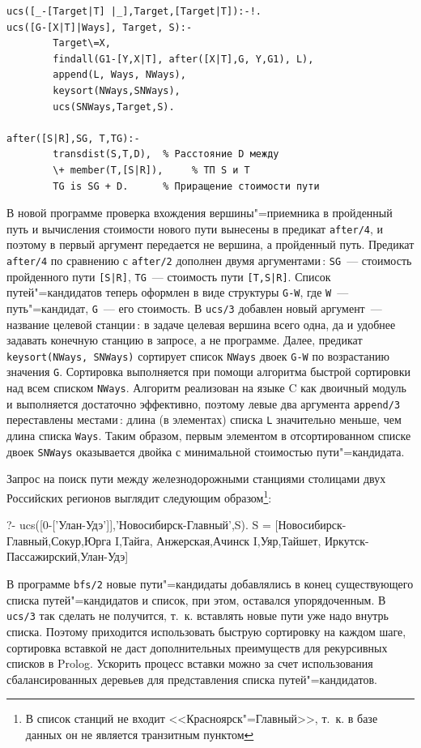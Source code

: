 \documentclass[a4paper,14pt, openany, twoside, draft]{extbook} %
\begin{document}
\begin{verbatim}
ucs([_-[Target|T] |_],Target,[Target|T]):-!.
ucs([G-[X|T]|Ways], Target, S):-
        Target\=X,
        findall(G1-[Y,X|T], after([X|T],G, Y,G1), L),
        append(L, Ways, NWays),
        keysort(NWays,SNWays),
        ucs(SNWays,Target,S).

after([S|R],SG, T,TG):-
        transdist(S,T,D),  % Расстояние D между
        \+ member(T,[S|R]),     % ТП S и T
        TG is SG + D.      % Приращение стоимости пути
\end{verbatim}


В новой программе проверка вхождения вершины"=приемника в пройденный путь и вычисления стоимости нового пути вынесены в предикат \texttt{after/4}, и поэтому в первый аргумент передается не вершина, а пройденный путь.  Предикат \texttt{after/4} по сравнению с \texttt{after/2} дополнен двумя аргументами\,: \texttt{SG}~--- стоимость пройденного пути \texttt{[S|R]}, \texttt{TG}~--- стоимость пути \texttt{[T,S|R]}.  Список путей"=кандидатов теперь оформлен в виде структуры \texttt{G-W}, где \texttt{W}~--- путь"=кандидат, \texttt{G}~--- его стоимость.  В \texttt{ucs/3} добавлен новый аргумент~--- название целевой станции\,: в задаче целевая вершина всего одна, да и удобнее задавать конечную станцию в запросе, а не программе.  Далее, предикат \texttt{keysort(NWays, SNWays)} сортирует список \texttt{NWays} двоек \texttt{G-W} по возрастанию значения \texttt{G}.  Сортировка выполняется при помощи алгоритма быстрой сортировки над всем списком \texttt{NWays}.  Алгоритм реализован на языке C как двоичный модуль и выполняется достаточно эффективно, поэтому левые два аргумента \texttt{append/3} переставлены местами\,: длина (в элементах) списка \texttt{L} значительно меньше, чем длина списка \texttt{Ways}.  Таким образом, первым элементом в отсортированном списке двоек \texttt{SNWays} оказывается двойка с минимальной стоимостью пути"=кандидата.

Запрос на поиск пути между железнодорожными станциями столицами двух Российских регионов выглядит следующим образом\footnote{В список станций не входит <<Красноярск"=Главный>>, т.~к. в базе данных он не является транзитным пунктом}:

\begin{proexp}
?- ucs([0-['Улан-Удэ']],'Новосибирск-Главный',S).
S = [Новосибирск-Главный,Сокур,Юрга I,Тайга,
    Анжерская,Ачинск I,Уяр,Тайшет,
    Иркутск-Пассажирский,Улан-Удэ]
\end{proexp}


В программе \texttt{bfs/2} новые пути"=кандидаты добавлялись в конец существующего списка путей"=кандидатов и список, при этом, оставался упорядоченным.  В \texttt{ucs/3} так сделать не получится, т.~к. вставлять новые пути уже надо внутрь списка.  Поэтому приходится использовать быструю сортировку на каждом шаге, сортировка вставкой не даст дополнительных преимуществ для рекурсивных списков в Prolog.  Ускорить процесс вставки можно за счет использования сбалансированных деревьев для представления списка путей"=кандидатов.
\end{document}
